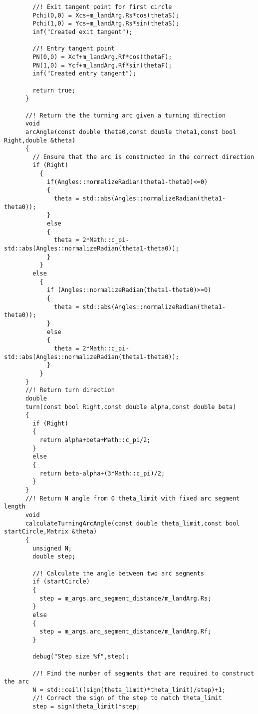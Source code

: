 \begin{frame}[fragile]
\begin{lstlisting}
        //! Exit tangent point for first circle
        Pchi(0,0) = Xcs+m_landArg.Rs*cos(thetaS);
        Pchi(1,0) = Ycs+m_landArg.Rs*sin(thetaS);
        inf("Created exit tangent");

        //! Entry tangent point
        PN(0,0) = Xcf+m_landArg.Rf*cos(thetaF);
        PN(1,0) = Ycf+m_landArg.Rf*sin(thetaF);
        inf("Created entry tangent");

        return true;
      }

      //! Return the the turning arc given a turning direction
      void
      arcAngle(const double theta0,const double theta1,const bool Right,double &theta)
      {
        // Ensure that the arc is constructed in the correct direction
        if (Right)
          {
            if(Angles::normalizeRadian(theta1-theta0)<=0)
            {
              theta = std::abs(Angles::normalizeRadian(theta1-theta0));
            }
            else
            {
              theta = 2*Math::c_pi-std::abs(Angles::normalizeRadian(theta1-theta0));
            }
          }
        else
          {
            if (Angles::normalizeRadian(theta1-theta0)>=0)
            {
              theta = std::abs(Angles::normalizeRadian(theta1-theta0));
            }
            else
            {
              theta = 2*Math::c_pi-std::abs(Angles::normalizeRadian(theta1-theta0));
            }
          }
      }
      //! Return turn direction
      double
      turn(const bool Right,const double alpha,const double beta)
      {
        if (Right)
        {
          return alpha+beta+Math::c_pi/2;
        }
        else
        {
          return beta-alpha+(3*Math::c_pi)/2;
        }
      }
      //! Return N angle from 0 theta_limit with fixed arc segment length
      void
      calculateTurningArcAngle(const double theta_limit,const bool startCircle,Matrix &theta)
      {
        unsigned N;
        double step;

        //! Calculate the angle between two arc segments
        if (startCircle)
        {
          step = m_args.arc_segment_distance/m_landArg.Rs;
        }
        else
        {
          step = m_args.arc_segment_distance/m_landArg.Rf;
        }

        debug("Step size %f",step);

        //! Find the number of segments that are required to construct the arc
        N = std::ceil((sign(theta_limit)*theta_limit)/step)+1;
        //! Correct the sign of the step to match theta_limit
        step = sign(theta_limit)*step;


\end{lstlisting}
\end{frame}
